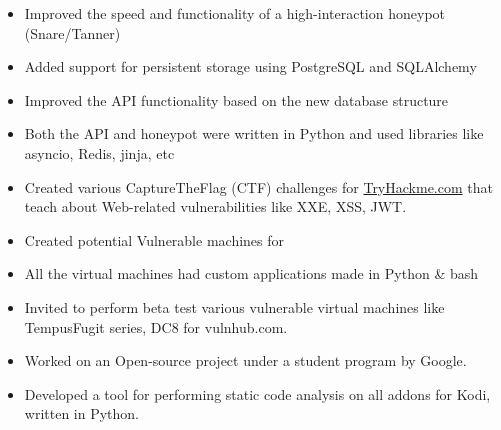 \documentclass[10pt,a4paper,ragged2e]{altacv}
\begin{document}
  \begin{itemize}
  \item Improved the speed and functionality of a high-interaction honeypot (Snare/Tanner)

  \item Added support for persistent storage using PostgreSQL and SQLAlchemy
  
  \item Improved the API functionality based on the new database structure
  
  \item Both the API and honeypot were written in Python and used libraries like asyncio, Redis, jinja, etc
  \end{itemize}


  \divider

  \begin{itemize}
    
    \item Created various CaptureTheFlag (CTF) challenges for \href{https://tryhackme.com/p/falconfeast}{TryHackme.com} that teach about Web-related vulnerabilities like XXE, XSS, JWT.

    \item Created potential Vulnerable machines for \href{https://www.vulnhub.com/series/djinn,260/}
    
    \item All the virtual machines had custom applications made in Python \& bash
  
    \item Invited to perform beta test various vulnerable virtual machines like TempusFugit series, DC8 for vulnhub.com.

  \end{itemize}

  \divider

  \begin{itemize}

  \item Worked on an Open-source project under a student program by Google.

  \item Developed a tool for performing static code analysis on all addons for Kodi, written in Python.

  \end{itemize}
\end{document}

